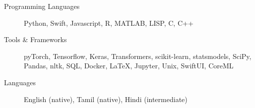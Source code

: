 \begin{description}
\item[Programming Languages] Python, Swift, Javascript, R, MATLAB, LISP, C, C++

\item[Tools \& Frameworks] pyTorch, Tensorflow, Keras, Transformers, scikit-learn, statsmodels, SciPy, Pandas, nltk, SQL, Docker, \LaTeX, Jupyter, Unix, SwiftUI, CoreML

\item[Languages] English (native), Tamil (native), Hindi (intermediate)
\end{description}
